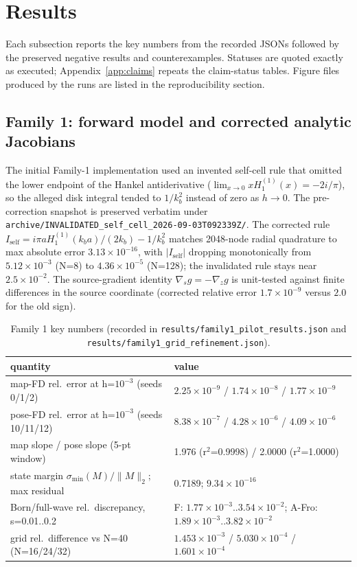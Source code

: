 \documentclass[12pt]{article}
\begin{document}
\section{Results}\label{sec:results}

Each subsection reports the key numbers from the recorded JSONs followed by
the preserved negative results and counterexamples. Statuses are quoted
exactly as executed; Appendix~\ref{app:claims} repeats the claim-status
tables. Figure files produced by the runs are listed in the reproducibility
section.

\subsection{Family 1: forward model and corrected analytic Jacobians}\label{sec:family1}

The initial Family-1 implementation used an invented self-cell rule that
omitted the lower endpoint of the Hankel antiderivative
($\lim_{x\to0}xH_1^{(1)}(x)=-2i/\pi$), so the alleged disk integral tended to
$1/k_b^2$ instead of zero as $h\to0$. The pre-correction snapshot is preserved
verbatim under \texttt{archive/INVALIDATED\_self\_cell\_2026-09-03T092339Z/}. The
corrected rule
$I_{\mathrm{self}}=i\pi a H_1^{(1)}(k_ba)/(2k_b)-1/k_b^2$ matches 2048-node
radial quadrature to max absolute error $3.13\times10^{-16}$, with
$|I_{\mathrm{self}}|$ dropping monotonically from $5.12\times10^{-3}$
(N=8) to $4.36\times10^{-5}$ (N=128); the invalidated rule stays near
$2.5\times10^{-2}$. The source-gradient identity
$\nabla_s g=-\nabla_z g$ is unit-tested against finite differences in the
source coordinate (corrected relative error $1.7\times10^{-9}$ versus
$2.0$ for the old sign).

\begin{table}[ht]
\centering
\small
\caption{Family 1 key numbers (recorded in
\texttt{results/family1\_pilot\_results.json} and
\texttt{results/family1\_grid\_refinement.json}).}
\label{tab:f1}
\begin{tabular}{l l}
\toprule
quantity & value \\
\midrule
map-FD rel.\ error at h=$10^{-3}$ (seeds 0/1/2) &
$2.25\times10^{-9}$ / $1.74\times10^{-8}$ / $1.77\times10^{-9}$ \\
pose-FD rel.\ error at h=$10^{-3}$ (seeds 10/11/12) &
$8.38\times10^{-7}$ / $4.28\times10^{-6}$ / $4.09\times10^{-6}$ \\
map slope / pose slope (5-pt window) &
1.976 (r$^2$=0.9998) / 2.0000 (r$^2$=1.0000) \\
state margin $\sigma_{\min}(M)/\|M\|_2$; max residual &
0.7189; $9.34\times10^{-16}$ \\
Born/full-wave rel.\ discrepancy, s=0.01..0.2 &
F: $1.77\times10^{-3}$..$3.54\times10^{-2}$; A-Fro: $1.89\times10^{-3}$..$3.82\times10^{-2}$ \\
grid rel.\ difference vs N=40 (N=16/24/32) &
$1.453\times10^{-3}$ / $5.030\times10^{-4}$ / $1.601\times10^{-4}$ \\
\bottomrule
\end{tabular}
\end{table}
\end{document}
